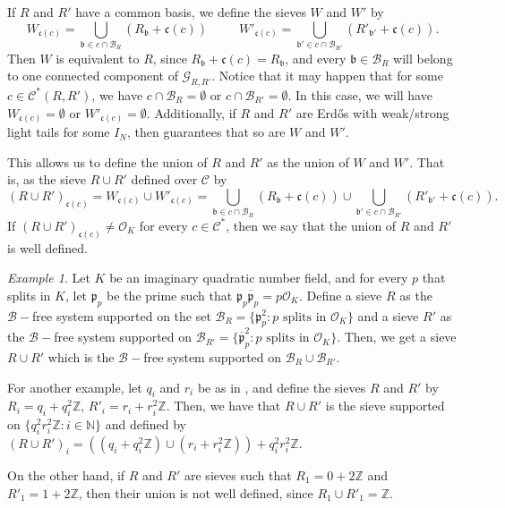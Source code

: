 \documentclass[a4paper,11pt,reqno]{amsart}
\theoremstyle{plain}
\theoremstyle{remark}
\newtheorem{example}[theorem]{Example}
\newcommand{\z}{\mathbb{Z}}
\newcommand{\cb}{\mathcal{B}}
\newcommand{\co}{\mathcal{O}}
\newcommand{\gb}{\mathfrak{b}}
\newcommand{\gc}{\mathfrak{c}}
\newcommand{\gp}{\mathfrak{p}}
\begin{document}
		If $R$ and $R'$ have a common basis, we define the sieves $W$ and $W'$ by $$W_{\gc(c)} = \bigcup_{\gb \in c\cap \cb_R} (R_\gb + \gc(c)) \hspace{30pt} W'_{\gc(c)} = \bigcup_{\gb' \in c\cap \cb_{R'}} (R'_{\gb'} + \gc(c)).$$
		Then $W$ is equivalent to $R$, since $R_\gb + \gc(c) = R_\gb$, and every $\gb \in \cb_R$ will belong to one connected component of $\mathcal{G}_{R,R'}$. Notice that it may happen that for some  $c \in \mathcal{C^*}(R,R')$, we have $c\cap \cb_R = \emptyset$ or $c\cap \cb_{R'} = \emptyset$. In this case, we will have $W_{\gc(c)} = \emptyset$ or $W'_{\gc(c)} = \emptyset$. Additionally, if $R$ and $R'$ are Erdős with weak/strong light tails for some $I_N$, then   guarantees that so are $W$ and $W'$.
		
		
		
		This allows us to define the union of $R$ and $R'$ as the union of $W$ and $W'$. That is, as the sieve $R \cup R'$ defined over $\mathcal{C}$ by $$(R \cup R')_{\gc(c)} = W_{\gc(c)} \cup W'_{\gc(c)} = \bigcup_{\gb \in c\cap \cb_R} (R_\gb + \gc(c)) \cup \bigcup_{\gb' \in c\cap \cb_{R'}} (R'_{\gb'} + \gc(c)).$$ If $(R \cup R')_{\gc(c)} \neq \co_K$ for every $c \in\mathcal{C^*}$, then we say that the union of $R$ and $R'$ is well defined. 
		
		

			
			\begin{example}
				Let $K$ be an imaginary quadratic number field, and for every $p$ that splits in $K$, let $\gp_p$ be the prime such that $\gp_p \overline{\gp}_p = p \co_K$. Define a sieve $R$ as the $\cb-$free system supported on the set  $\cb_R = \{\gp_p^2: p \text{ splits in } \co_K\}$ and a sieve $R'$ as the $\cb-$free system supported on $\cb_{R'} = \{\overline{\gp}_p^2: p \text{ splits in } \co_K\}$. Then, we get a sieve $R\cup R'$ which is the $\cb-$free system supported on $\cb_R \cup \cb_{R'}$.
				
				For another example, let $q_i$ and $r_i$ be as in , and define the sieves $R$ and $R'$ by $R_i =q_i + q_i^2\z$, $R'_i = r_i + r_i^2\z$. Then, we have that $R \cup R'$ is the sieve supported on $\{q_i^2r_i^2\z:i \in \mathbb{N}\}$ and defined by $(R \cup R')_i = ((q_i+q_i^2\z) \cup ( r_i + r_i^2\z)) + q_i^2r_i^2\z$.
				
				On the other hand, if $R$ and $R'$ are sieves such that $R_1 = 0+2\z$ and $R'_1 = 1+2\z$, then their union is not well defined, since $R_1 \cup R'_1 = \z$.
			\end{example}
			
\end{document}
